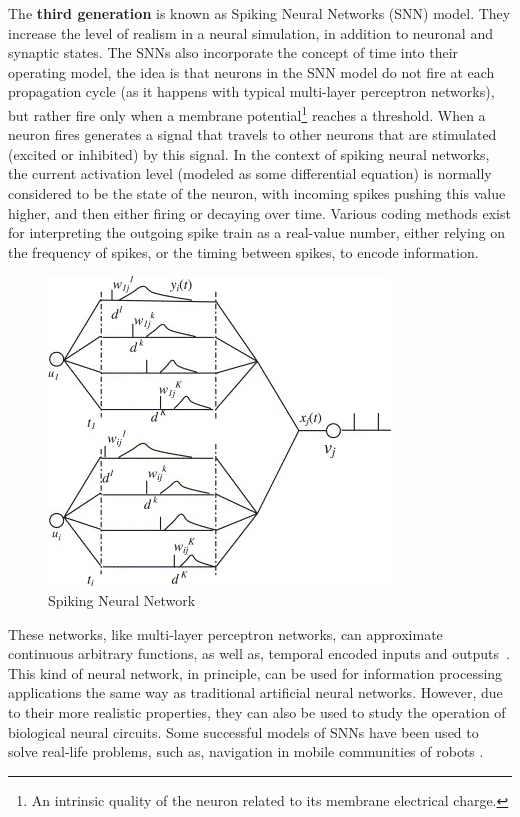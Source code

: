 The \textbf{third generation} is known as Spiking Neural Networks (SNN) model. They increase the level of realism in a neural simulation, in addition to neuronal and synaptic states. The SNNs also incorporate the concept of time into their operating model, the idea is that neurons in the SNN model do not fire at each propagation cycle (as it happens with typical multi-layer perceptron networks), but rather fire only when a membrane potential\footnote{An intrinsic quality of the neuron related to its membrane electrical charge.} reaches a threshold. When a neuron fires generates a signal that travels to other neurons that are stimulated (excited or inhibited) by this signal. In the context of spiking neural networks, the current activation level (modeled as some differential equation) is normally considered to be the state of the neuron, with incoming spikes pushing this value higher, and then either firing or decaying over time. Various coding methods exist for interpreting the outgoing spike train as a real-value number, either relying on the frequency of spikes, or the timing between spikes, to encode information.

\begin{figure}[ht]
    \centering
    \includegraphics[scale=4.0]{images/Figure10SNN.png}
    \caption{Spiking Neural Network}
    \label{fig:Spiking Neural Network}
\end{figure}

These networks, like multi-layer perceptron networks, can approximate continuous arbitrary functions, as well as, temporal encoded inputs and outputs~\cite{Maass1996}.  This kind of neural network, in principle, can be used for information processing applications the same way as traditional artificial neural networks. However, due to their more realistic properties, they can also be used to study the operation of biological neural circuits. Some successful models of SNNs have been used to solve real-life problems, such as, navigation in mobile communities of robots \cite{WangHouZou2008}.

